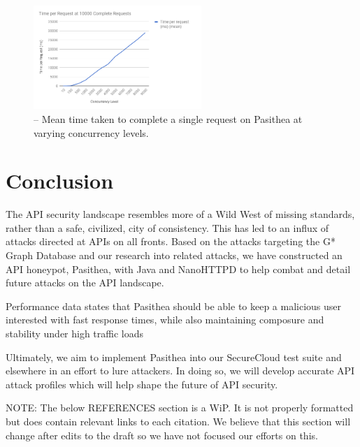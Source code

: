 \documentclass[10pt, conference]{IEEEtran}
\begin{document}
\begin{figure}[h]
\centering
\includegraphics[width=2.5in]{images/TimeperRequest.png} 
\caption{-- Mean time taken to complete a single request on Pasithea at varying concurrency levels.}
\end{figure}

\section{Conclusion}
\label{conclusion}
The API security landscape resembles more of a Wild West of missing standards, rather than a safe, civilized, city of consistency. This has led to an influx of attacks directed at APIs on all fronts. Based on the attacks targeting the G* Graph Database and our research into related attacks, we have constructed an API honeypot, Pasithea, with Java and NanoHTTPD to help combat and detail future attacks on the API landscape. 

Performance data states that Pasithea should be able to keep a malicious user interested with fast response times, while also maintaining composure and stability under high traffic loads

Ultimately, we aim to implement Pasithea into our SecureCloud test suite and elsewhere in an effort to lure attackers. In doing so, we will develop accurate API attack profiles which will help shape the future of API security.

NOTE: The below REFERENCES section is a WiP. It is not properly formatted but does contain relevant links to each citation. We believe that this section will change after edits to the draft so we have not focused our efforts on this.



\end{document}
